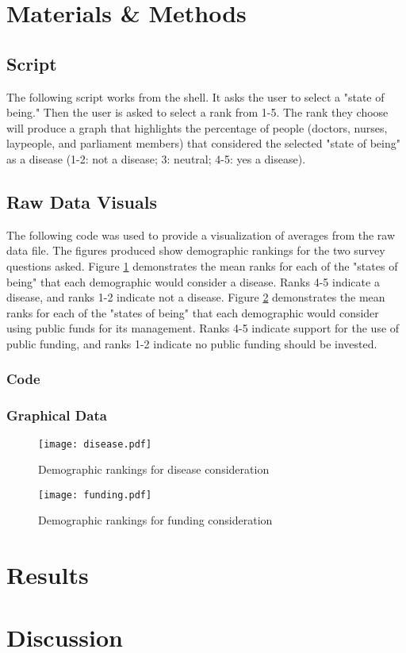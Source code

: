 \documentclass{article}
\begin{document}
\section{Materials \& Methods}
\subsection{Script}
The following script works from the shell. It asks the user to select a "state of being." Then the user is asked to select a rank from 1-5. The rank they choose will produce a graph that highlights the percentage of people (doctors, nurses, laypeople, and parliament members) that considered the selected "state of being" as a disease (1-2: not a disease; 3: neutral; 4-5: yes a disease). 


\subsection{Raw Data Visuals}
The following code was used to provide a visualization of averages from the raw data file. The figures produced show demographic rankings for the two survey questions asked. Figure \ref{fig:disease} demonstrates the mean ranks for each of the "states of being" that each demographic would consider a disease. Ranks 4-5 indicate a disease, and ranks 1-2 indicate not a disease. Figure \ref{fig:funding} demonstrates the mean ranks for each of the "states of being" that each demographic would consider using public funds for its management. Ranks 4-5 indicate support for the use of public funding, and ranks 1-2 indicate no public funding should be invested.
\subsubsection{Code}


\subsubsection{Graphical Data}
\begin{figure}[H]
\centering
  \texttt{[image: disease.pdf]}
  \caption{Demographic rankings for disease consideration}
  \label{fig:disease}
\end{figure}

\begin{figure}[H]
\centering
  \texttt{[image: funding.pdf]}
  \caption{Demographic rankings for funding consideration}
  \label{fig:funding}
\end{figure}

\section{Results}


\section{Discussion}

\newpage

 
\end{document}
